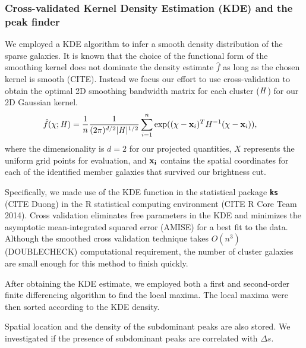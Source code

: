 \subsubsection{Cross-validated Kernel Density Estimation (KDE) and the peak finder} 
\label{subsubsec:KDE}
We employed a KDE algorithm to infer a smooth density distribution of the
sparse galaxies.
It is known that the choice of the functional form of the smoothing kernel does
not dominate the density estimate $\hat{f}$ as long as the chosen kernel is
smooth (CITE). Instead we focus our effort to use cross-validation to obtain 
the optimal 2D smoothing
bandwidth matrix for each cluster ($\mathbf{\it H}$) for our 2D Gaussian kernel. 
\begin{align}
	\hat{f}(\chi; \mathbf{\it H}) &= \frac{1}{n} \frac{1}{(2\pi)^{d/2}|\mathbf{\it H}|^{1/2}}
	\sum_{i=1}^n \exp((\chi-{\bf x}_i)^T H^{-1} (\chi-{\bf x}_i)),
\end{align}
where the dimensionality is $d=2$ for our projected quantities,
$X$ represents the uniform grid points for evaluation, and 
$\bf{x}_i$ contains the spatial coordinates for each of the identified member 
galaxies that survived our brightness cut.

Specifically, we made use of the KDE function in
the statistical package {\bf \texttt{ks}} (CITE Duong) in the R statistical 
computing environment (CITE R Core Team 2014). 
Cross validation eliminates free parameters in the KDE and minimizes
the asymptotic mean-integrated squared error (AMISE) for a best fit to the
data. Although the smoothed cross validation technique takes $O(n^3)$
(DOUBLECHECK) computational requirement, the number of cluster galaxies are
small enough for this method to finish quickly. 

After obtaining the KDE estimate, we employed both a first and second-order  
finite differencing algorithm to find the local maxima.  
The local maxima were then sorted according to the KDE density.  



Spatial location and the density of the subdominant peaks are also stored.
We investigated if the presence of subdominant peaks are correlated with
$\Delta s$. 

